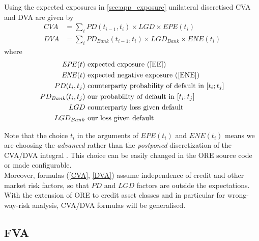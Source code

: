 \documentclass[12pt, a4paper]{article}
\newcommand{\CVA}{\mathit{CVA}}
\newcommand{\DVA}{\mathit{DVA}}
\newcommand{\EPE}{\mathit{EPE}}
\newcommand{\ENE}{\mathit{ENE}}
\newcommand{\PD}{\mathit{PD}}
\newcommand{\LGD}{\mathit{LGD}}
\begin{document}
\begin{appendix}
Using the expected exposures in \ref{sec:app_exposure} unilateral discretised CVA and DVA are given by \cite{Lichters}
\begin{align}
\CVA &= \sum_{i} \PD(t_{i-1},t_i)\times\LGD\times \EPE(t_i) \label{CVA}\\
\DVA &= \sum_{i} \PD_{Bank}(t_{i-1},t_i)\times\LGD_{Bank}\times \ENE(t_i) \label{DVA}
\end{align}
where
\begin{align*}
\EPE(t) & \mbox{ expected exposure (\ref{EE})}\\
\ENE(t) & \mbox{ expected negative exposure (\ref{ENE})}\\
PD(t_i,t_j) & \mbox{ counterparty probability of default in } [t_i;t_j]\\
PD_{Bank}(t_i,t_j) & \mbox{ our probability of default in } [t_i;t_j]\\
LGD & \mbox{ counterparty loss given default}\\
LGD_{Bank} & \mbox{ our loss given default}\\
\end{align*}

Note that the choice $t_i$ in the arguments of $\EPE(t_i)$ and $\ENE(t_i)$ means we are choosing the {\em advanced}
rather than the {\em postponed} discretization of the CVA/DVA integral \cite{BrigoMercurio}. This choice can be easily
changed in the ORE source code or made configurable. \\

Moreover, formulas (\ref{CVA}, \ref{DVA}) assume independence of credit and other market risk factors, so that $\PD$ and
$\LGD$ factors are outside the expectations. With the extension of ORE to credit asset classes and in particular for
wrong-way-risk analysis, CVA/DVA formulas will be generalised.

\subsection{FVA}\label{sec:fva}


\end{appendix}
\end{document}
